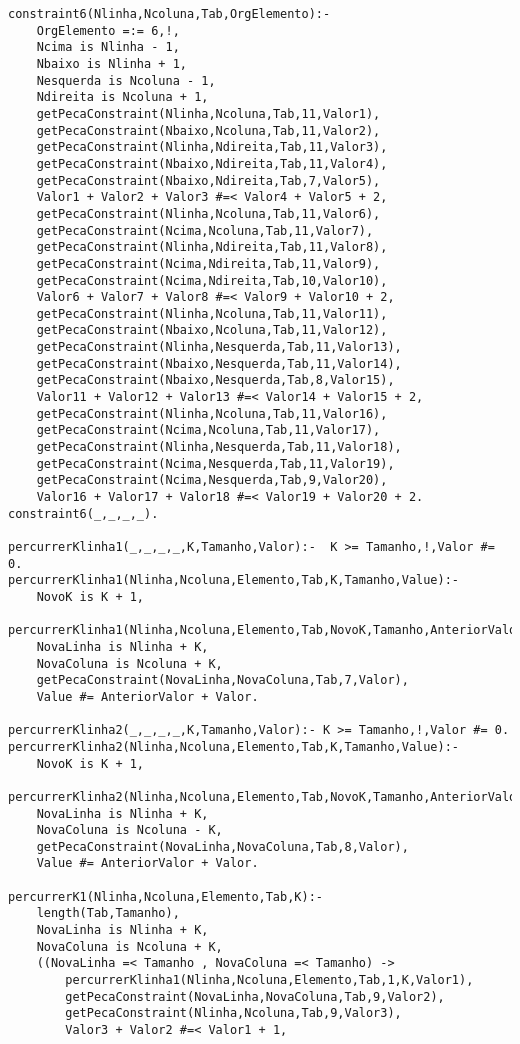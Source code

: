 \documentclass[runningheads]{llncs}
\begin{document}
\begin{lstlisting}
constraint6(Nlinha,Ncoluna,Tab,OrgElemento):-
    OrgElemento =:= 6,!,
    Ncima is Nlinha - 1,
    Nbaixo is Nlinha + 1,
    Nesquerda is Ncoluna - 1,
    Ndireita is Ncoluna + 1,
    getPecaConstraint(Nlinha,Ncoluna,Tab,11,Valor1),
    getPecaConstraint(Nbaixo,Ncoluna,Tab,11,Valor2),
    getPecaConstraint(Nlinha,Ndireita,Tab,11,Valor3),
    getPecaConstraint(Nbaixo,Ndireita,Tab,11,Valor4),
    getPecaConstraint(Nbaixo,Ndireita,Tab,7,Valor5),
    Valor1 + Valor2 + Valor3 #=< Valor4 + Valor5 + 2,
    getPecaConstraint(Nlinha,Ncoluna,Tab,11,Valor6),
    getPecaConstraint(Ncima,Ncoluna,Tab,11,Valor7),
    getPecaConstraint(Nlinha,Ndireita,Tab,11,Valor8),
    getPecaConstraint(Ncima,Ndireita,Tab,11,Valor9),
    getPecaConstraint(Ncima,Ndireita,Tab,10,Valor10),
    Valor6 + Valor7 + Valor8 #=< Valor9 + Valor10 + 2,
    getPecaConstraint(Nlinha,Ncoluna,Tab,11,Valor11),
    getPecaConstraint(Nbaixo,Ncoluna,Tab,11,Valor12),
    getPecaConstraint(Nlinha,Nesquerda,Tab,11,Valor13),
    getPecaConstraint(Nbaixo,Nesquerda,Tab,11,Valor14),
    getPecaConstraint(Nbaixo,Nesquerda,Tab,8,Valor15),
    Valor11 + Valor12 + Valor13 #=< Valor14 + Valor15 + 2,
    getPecaConstraint(Nlinha,Ncoluna,Tab,11,Valor16),
    getPecaConstraint(Ncima,Ncoluna,Tab,11,Valor17),
    getPecaConstraint(Nlinha,Nesquerda,Tab,11,Valor18),
    getPecaConstraint(Ncima,Nesquerda,Tab,11,Valor19),
    getPecaConstraint(Ncima,Nesquerda,Tab,9,Valor20),
    Valor16 + Valor17 + Valor18 #=< Valor19 + Valor20 + 2.
constraint6(_,_,_,_).

percurrerKlinha1(_,_,_,_,K,Tamanho,Valor):-  K >= Tamanho,!,Valor #= 0.
percurrerKlinha1(Nlinha,Ncoluna,Elemento,Tab,K,Tamanho,Value):-
    NovoK is K + 1,
    percurrerKlinha1(Nlinha,Ncoluna,Elemento,Tab,NovoK,Tamanho,AnteriorValor),!,
    NovaLinha is Nlinha + K,
    NovaColuna is Ncoluna + K,
    getPecaConstraint(NovaLinha,NovaColuna,Tab,7,Valor),
    Value #= AnteriorValor + Valor.

percurrerKlinha2(_,_,_,_,K,Tamanho,Valor):- K >= Tamanho,!,Valor #= 0.
percurrerKlinha2(Nlinha,Ncoluna,Elemento,Tab,K,Tamanho,Value):-
    NovoK is K + 1,
    percurrerKlinha2(Nlinha,Ncoluna,Elemento,Tab,NovoK,Tamanho,AnteriorValor),!,
    NovaLinha is Nlinha + K,
    NovaColuna is Ncoluna - K,
    getPecaConstraint(NovaLinha,NovaColuna,Tab,8,Valor),
    Value #= AnteriorValor + Valor.

percurrerK1(Nlinha,Ncoluna,Elemento,Tab,K):-
    length(Tab,Tamanho),
    NovaLinha is Nlinha + K,
    NovaColuna is Ncoluna + K,
    ((NovaLinha =< Tamanho , NovaColuna =< Tamanho) ->
        percurrerKlinha1(Nlinha,Ncoluna,Elemento,Tab,1,K,Valor1),
        getPecaConstraint(NovaLinha,NovaColuna,Tab,9,Valor2),
        getPecaConstraint(Nlinha,Ncoluna,Tab,9,Valor3),
        Valor3 + Valor2 #=< Valor1 + 1,


\end{lstlisting}
\end{document}
